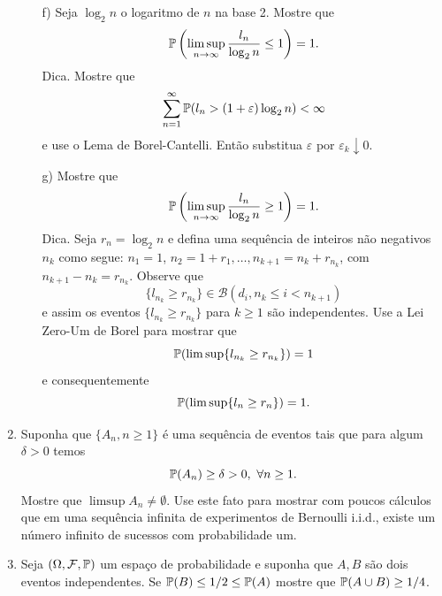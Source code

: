 \begin{enumerate}[leftmargin=*]
\begin{itemize}
	\item[f)]
	Seja $\log_2 n$ o logaritmo de $n$ na base 2. 
	Mostre que 
		\[
			\P\left(
				\limsup_{n\to\infty} \frac{l_n}{\log_2 n}\leq 1
			\right)
			=1.
		\]
	Dica. Mostre que 
		\[
			\sum_{n=1}^{\infty}
			\P(l_n>(1+\varepsilon)\log_2 n)<\infty
		\]
	e use o Lema de Borel-Cantelli. Então substitua $\varepsilon$ 
	por $\varepsilon_k\downarrow 0$.
	
	\item[g)] 
	Mostre que 
		\[
			\P\left(
				\limsup_{n\to\infty} \frac{l_n}{\log_2 n}\geq 1
			\right)
			=1.
		\]
	Dica. Seja $r_n =\log_2 n$ e defina uma sequência 
	de inteiros não negativos $n_k$ como segue:
	$n_1=1$, $n_2=1+r_1,\ldots, n_{k+1}=n_k+r_{n_k}$, com 
	$n_{k+1}-n_{k}=r_{n_k}$.
	Observe que 
		\[
			\{l_{n_k}\geq r_{n_k}\}\in 
			\mathscr{B}(d_i, n_k\leq i <n_{k+1})
		\]
	e assim os eventos $\{l_{n_k}\geq r_{n_k}\}$ para
	$k\geq 1$ são independentes. Use a Lei Zero-Um de Borel
	para mostrar que 
		\[
			\P(\limsup \{ l_{n_k} \geq r_{n_k} \}) = 1
		\]
	e consequentemente 
		\[
			\P(\limsup \{ l_{n} \geq r_{n} \}) = 1.
		\]
		
	\end{itemize}






























\item Suponha que $\{A_n, n\geq 1\}$ é uma sequência de eventos 
tais que para algum $\delta>0$ temos 
	\[
		\P(A_n)\geq \delta >0, \ \forall n\geq 1.
	\]
Mostre que $\limsup A_n \neq \emptyset$.
Use este fato para mostrar com poucos cálculos que em 
uma sequência infinita de experimentos de Bernoulli i.i.d., 
existe um número infinito de sucessos com probabilidade
um.






\item 
Seja $(\Omega,\F,\P)$ um espaço de probabilidade e 
suponha que $A,B$ são dois eventos independentes.
Se $\P(B)\leq 1/2\leq \P(A)$ mostre que 
$\P(A\cup B)\geq 1/4$.







\end{enumerate}

